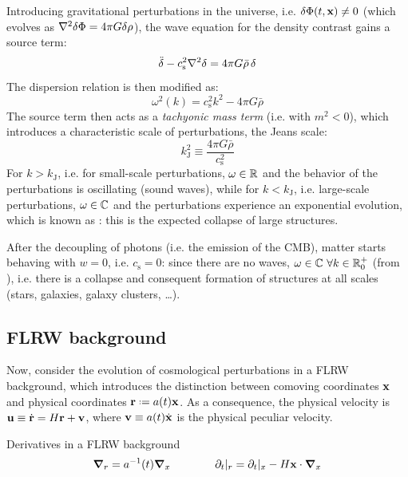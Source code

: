 Introducing gravitational perturbations in the universe, i.e. $ \delta \Phi(t,\mathbf{x}) \neq 0 $ (which evolves as $ \nabla^2 \delta \Phi = 4 \pi G \delta \rho $), the wave equation for the density contrast gains a source term:
\begin{equation}
  \ddot{\delta} - c_\text{s}^2 \nabla^2 \delta = 4 \pi G \bar{\rho} \, \delta
  \label{eq:wave-no-grav}
\end{equation}
The dispersion relation is then modified as:
\begin{equation}
  \omega^2(k) = c_\text{s}^2 k^2 - 4 \pi G \bar \rho
  \label{eq:jeans-no-grav}
\end{equation}
The source term then acts as a \emph{tachyonic mass term} (i.e. with $ m^2 < 0$), which introduces a characteristic scale of perturbations, the Jeans scale:
\begin{equation}
  k_\text{J}^2 \equiv \frac{4 \pi G \bar{\rho}}{c_\text{s}^2}
\end{equation}
For $ k > k_\text{J} $, i.e. for small-scale perturbations, $ \omega \in \mathbb{R} $ and the behavior of the perturbations is oscillating (sound waves), while for $ k < k_\text{J} $, i.e. large-scale perturbations, $ \omega \in \mathbb{C} $ and the perturbations experience an exponential evolution, which is known as : this is the expected collapse of large structures.

After the decoupling of photons (i.e. the emission of the CMB), matter starts behaving with $ w = 0 $, i.e. $ c_\text{s} = 0 $: since there are no waves, $ \omega \in \mathbb{C} \,\, \forall k \in \mathbb{R}^+_0 $ (from ), i.e. there is a collapse and consequent formation of structures at all scales (stars, galaxies, galaxy clusters, \dots).

\subsection{FLRW background}

Now, consider the evolution of cosmological perturbations in a FLRW background, which introduces the distinction between comoving coordinates $ \mathbf{x} $ and physical coordinates $ \ve{r} \defeq a(t) \ve{x} $. As a consequence, the physical velocity is $ \mathbf{u} \equiv \dot{\mathbf{r}} = H \mathbf{r} + \mathbf{v} $, where $ \mathbf{v} \equiv a(t) \dot{\mathbf{x}} $ is the physical peculiar velocity.

\begin{lemma}[before upper = {\tcbtitle}]{Derivatives in a FLRW background}{}
  \begin{equation}
  \boldsymbol{\nabla}_r = a^{-1}(t) \boldsymbol{\nabla}_x
  \qquad \qquad
  \partial_t \vert_r = \partial_t \vert_x - H \mathbf{x} \cdot \boldsymbol{\nabla}_x
\end{equation}
\end{lemma}

